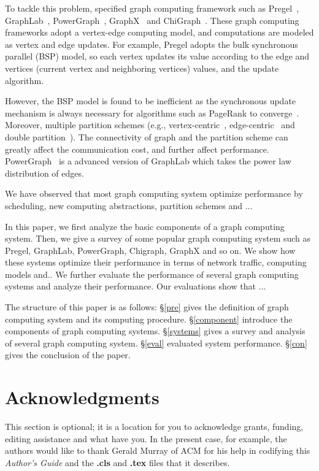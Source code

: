 \documentclass{acm_proc_article}
\newcommand{\eg}[0]{e.g.,}
\newcommand{\chref}[1]{\S\ref{#1}}
\begin{document}
To tackle this problem, specified graph computing framework such as
Pregel~\cite{sigmod10:pregel},
GraphLab~\cite{graphlab}, PowerGraph~\cite{powergraph}, GraphX~\cite{graphx}
and ChiGraph~\cite{chigraph}. These graph computing frameworks
adopt a vertex-edge computing model, and computations are modeled
as vertex and edge updates. For example, Pregel adopts the bulk
synchronous parallel (BSP) model, so each vertex updates its value according
to the edge and vertices (current vertex and neighboring vertices) values, and
the update algorithm.

However, the BSP model is found to be inefficient as the synchronous update
mechanism is always necessary for algorithms such as PageRank to
converge~\cite{graphlab}. Moreover, multiple partition schemes (\eg{} vertex-centric~\cite{sigmod10:pregel},
edge-centric~\cite{edge} and double partition~\cite{osdi16}). The connectivity
of graph and the partition scheme can greatly affect the communication cost, and
further affect performance. PowerGraph~\cite{powergraph} is a advanced version of
GraphLab which takes the power law distribution of edges.

We have observed that most graph computing system optimize performance by
scheduling, new computing abstractions, partition schemes and ...

In this paper, we first analyze the basic components of a graph computing
system. Then, we give a survey of some popular graph computing system
such as Pregel, GraphLab, PowerGraph, Chigraph, GraphX and so on. We show
how these systems optimize their performance in terms of network traffic,
computing models and..
We further evaluate the performance of several graph computing systems
and analyze their performance.
Our evaluations show that ...

The structure of this paper is as follows: \chref{pre} gives the definition
of graph computing system and its computing procedure. \chref{component}
introduce the components of graph computing systems. \chref{systems} gives
a survey and analysis of several graph computing system. \chref{eval} evaluated
system performance. \chref{con} gives the conclusion of the paper.









\section{Acknowledgments}
This section is optional; it is a location for you
to acknowledge grants, funding, editing assistance and
what have you.  In the present case, for example, the
authors would like to thank Gerald Murray of ACM for
his help in codifying this \textit{Author's Guide}
and the \textbf{.cls} and \textbf{.tex} files that it describes.


\end{document}
